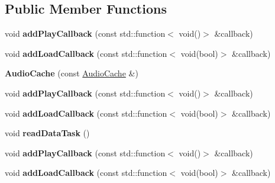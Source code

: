 \subsection*{Public Member Functions}
\begin{DoxyCompactItemize}
\item 
\mbox{\label{classexperimental_1_1AudioCache_afb4446ca6e6ab9864d447f28f6ca950b}} 
void {\bfseries add\+Play\+Callback} (const std\+::function$<$ void()$>$ \&callback)
\item 
\mbox{\label{classexperimental_1_1AudioCache_a432859e958df2cebc91c77961f4fa5ea}} 
void {\bfseries add\+Load\+Callback} (const std\+::function$<$ void(bool)$>$ \&callback)
\item 
\mbox{\label{classexperimental_1_1AudioCache_a5177955b0f519d466c638adcf25db4d0}} 
{\bfseries Audio\+Cache} (const \hyperlink{classexperimental_1_1AudioCache}{Audio\+Cache} \&)
\item 
\mbox{\label{classexperimental_1_1AudioCache_afb4446ca6e6ab9864d447f28f6ca950b}} 
void {\bfseries add\+Play\+Callback} (const std\+::function$<$ void()$>$ \&callback)
\item 
\mbox{\label{classexperimental_1_1AudioCache_a432859e958df2cebc91c77961f4fa5ea}} 
void {\bfseries add\+Load\+Callback} (const std\+::function$<$ void(bool)$>$ \&callback)
\item 
\mbox{\label{classexperimental_1_1AudioCache_a1c1e43dd3c80cfb7fbc74ef554df4c71}} 
void {\bfseries read\+Data\+Task} ()
\item 
\mbox{\label{classexperimental_1_1AudioCache_afb4446ca6e6ab9864d447f28f6ca950b}} 
void {\bfseries add\+Play\+Callback} (const std\+::function$<$ void()$>$ \&callback)
\item 
\mbox{\label{classexperimental_1_1AudioCache_a432859e958df2cebc91c77961f4fa5ea}} 
void {\bfseries add\+Load\+Callback} (const std\+::function$<$ void(bool)$>$ \&callback)
\item 

\end{DoxyCompactItemize}

